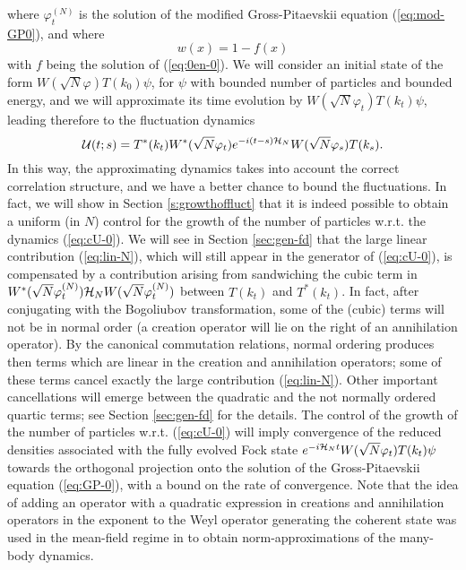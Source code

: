 \documentclass[11pt,a4paper]{article}
\newcommand{\cU}{{\cal U}}
\newcommand{\cH}{{\cal H}}
\begin{document}
where $\varphi^{(N)}_t$ is the solution of the modified Gross-Pitaevskii equation (\ref{eq:mod-GP0}), and where
\[ w (x) = 1 - f(x) \]
with $f$ being the solution of (\ref{eq:0en-0}). We will consider an initial state of the form $W(\sqrt{N} \varphi) T(k_0) \psi$, for $\psi$ with bounded number of particles and bounded energy, and we will approximate its time evolution by $W(\sqrt{N} \varphi_t) T(k_t) \psi$, leading therefore to the fluctuation dynamics 
\begin{equation}\label{eq:cU-0} \cU (t;s) = T^* (k_t) W^* (\sqrt{N}
\varphi_t) e^{-i(t-s) \cH_N} W(\sqrt{N} \varphi_s) T(k_s). \end{equation}
In this way, the approximating dynamics takes into account the correct correlation structure, and we have a better chance to bound the fluctuations. In fact, we will show in Section \ref{s:growthoffluct} that it is indeed possible to obtain a uniform (in $N$) control for the growth of the number of particles w.r.t. the dynamics (\ref{eq:cU-0}). We will see in Section \ref{sec:gen-fd} that the large linear contribution (\ref{eq:lin-N}), which will still appear in the generator of (\ref{eq:cU-0}), is compensated by a contribution arising from sandwiching the cubic term in $W^* (\sqrt{N} \varphi_t^{(N)}) \cH_N W(\sqrt{N} \varphi_t^{(N)})$ between $T(k_t)$ and $T^* (k_t)$. In fact, after conjugating with the Bogoliubov transformation, some of the (cubic) terms will not be in normal order (a creation operator will lie on the right of an annihilation operator). By the canonical commutation relations, normal ordering produces then terms which are linear in the creation and annihilation operators; some of these terms cancel exactly the large contribution (\ref{eq:lin-N}). Other important cancellations will emerge between the quadratic and the not normally ordered quartic terms; see Section \ref{sec:gen-fd} for the details. The control of the growth of the number of particles w.r.t. (\ref{eq:cU-0}) will imply convergence of the reduced densities associated with the fully evolved Fock state $e^{-i \cH_N t} W(\sqrt{N} \varphi_t) T(k_t) \psi$ towards the orthogonal projection onto the solution of the Gross-Pitaevskii equation (\ref{eq:GP-0}), with a bound on the rate of convergence. Note that the idea of adding an operator with a quadratic expression in creations and annihilation operators in the exponent to the Weyl operator generating the coherent state was used in the mean-field regime in \cite{GMM2010} to obtain norm-approximations of the many-body dynamics. 
\end{document}
